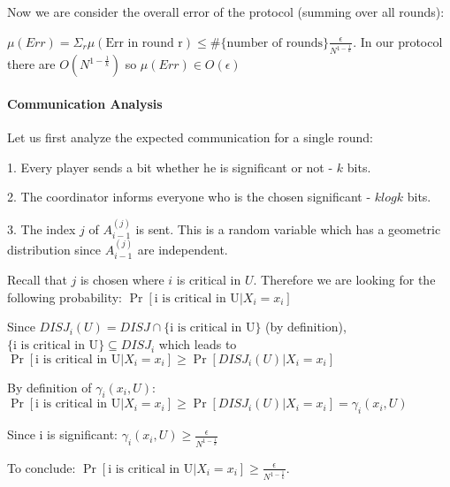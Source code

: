 \documentclass{article}
\theoremstyle{plain}
\begin{document}
Now we are consider the overall error of the protocol (summing over all rounds):

$\mu(Err) = \Sigma_{r} \mu(\text{Err in round r}) \leq \#\{\text{number of rounds}\} \frac{\epsilon}{N^{1-\frac{1}{k}}}$. \newline
In our protocol there are $O(N^{1-\frac{1}{k}})$ so
$\mu(Err) \in O(\epsilon)$

\paragraph{Communication Analysis}
Let us first analyze the expected communication for a single round: \newline

1. Every player sends a bit whether he is significant or not - $k$ bits.\newline

2. The coordinator informs everyone who is the chosen significant - $klogk$ bits. \newline

3. The index $j$ of $A_{i-1}^{(j)}$ is sent. \newline
This is a random variable which has a geometric distribution since $A_{i-1}^{(j)}$ are independent. \newline

Recall that $j$ is chosen where $i$ is critical in $U$. \newline
Therefore we are looking for the following probability:
$\Pr[\text{i is critical in U}| X_i = x_i]$ \newline

Since $DISJ_i(U) = DISJ \cap \{\text{i is critical in U}\}$ (by definition), $\{\text{i is critical in U}\} \subseteq DISJ_i$ which leads to \newline
$\Pr[\text{i is critical in U}| X_i = x_i] \geq \Pr[DISJ_i(U) | X_i = x_i]$ \newline

By definition of $\gamma_i(x_i, U)$: \newline
$\Pr[\text{i is critical in U}| X_i = x_i] \geq \Pr[DISJ_i(U) | X_i = x_i] = \gamma_i(x_i, U) $\newline

Since i is significant: \newline
$\gamma_i(x_i, U) \geq \frac{\epsilon}{N^{1-\frac{1}{k}}}$ \newline

To conclude: $\Pr[\text{i is critical in U}| X_i = x_i] \geq \frac{\epsilon}{N^{1-\frac{1}{k}}}$. \newline
\end{document}
